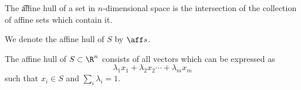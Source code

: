 


The \t{affine hull} of a set in $n$-dimensional space is the intersection of the collection of affine sets which contain it.


We denote the affine hull of $S$ by $\aff s$.

\begin{prop}
  The affine hull of $S \subset \R^n$ consists of all vectors which can be expressed as
  $$
    \lambda_1 x_1 + \lambda_2 x_2 \cdots + \lambda_m x_m
  $$
  such that $x_i \in S$ and $\sum_i \lambda_i = 1$.
\end{prop}
